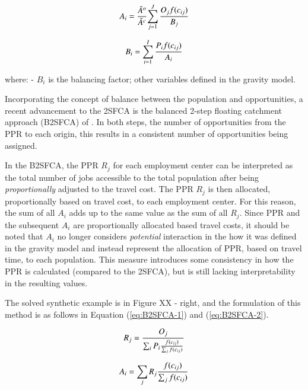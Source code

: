 \documentclass[]{elsarticle} %
\begin{document}
\begin{equation}
\label{eq:Inverse-balancing-1}
A_{i} = \frac{\bar A^{o}}{\bar A^{c}}{\sum_{j=1}^{J} \frac{O_{j}f(c_{ij})}{B_{j}}}\\
\end{equation}

\begin{equation}
\label{eq:Inverse-balancing-2}
B_{i} = {\sum_{i=1}^{I} \frac{P_{i}f(c_{ij})}{A_{i}}}\\
\end{equation}

\noindent where: - \(B_{i}\) is the balancing factor; other variables
defined in the gravity model.

Incorporating the concept of balance between the population and
opportunities, a recent advancement to the 2SFCA is the balanced 2-step
floating catchment approach (B2SFCA) of \citep{paez2019}. In both steps,
the number of opportunities from the PPR to each origin, this results in
a consistent number of opportunities being assigned.

In the B2SFCA, the PPR \(R_{j}\) for each employment center can be
interpreted as the total number of jobs accessible to the total
population after being \emph{proportionally} adjusted to the travel
cost. The PPR \(R_{j}\) is then allocated, proportionally based on
travel cost, to each employment center. For this reason, the sum of all
\(A_{i}\) adds up to the same value as the sum of all \(R_{j}\). Since
PPR and the subsequent \(A_{i}\) are proportionally allocated based
travel costs, it should be noted that \(A_{i}\) no longer considers
\emph{potential} interaction in the how it was defined in the gravity
model \citep{hansen1959} and instead represent the allocation of PPR,
based on travel time, to each population. This measure introduces some
consistency in how the PPR is calculated (compared to the 2SFCA), but is
still lacking interpretability in the resulting values.

The solved synthetic example is in Figure XX - right, and the
formulation of this method is as follows in Equation (\ref{eq:B2SFCA-1})
and (\ref{eq:B2SFCA-2}).

\begin{equation}
\label{eq:B2SFCA-1}
R_{j} = \frac{O_{j}}{\sum_i P_{i} \frac{f(c_{ij})}{\sum_j f(c_{ij})}}\\
\end{equation}

\begin{equation}
\label{eq:B2SFCA-2}
A_{i} = {\sum_j R_{j}\frac{f(c_{ij})}{\sum_j f(c_{ij})}}\\
\end{equation}
\end{document}
